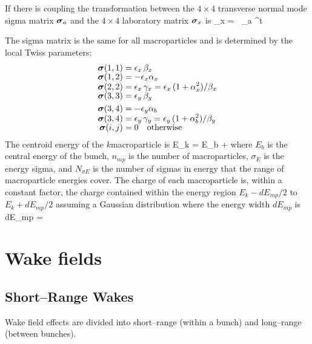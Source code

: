 If there is coupling the transformation between the $4\times 4$
transverse normal mode sigma matrix $\boldsymbol{\sigma}_a$ and the $4\times 4$
laboratory matrix $\boldsymbol{\sigma}_x$ is
\Begineq
  \bfsig_x = \bfV \, \bfsig_a \bfV^t
\Endeq

The sigma matrix is the same for all macroparticles and is
determined by the local Twiss parameters:
\begin{align}
  \bfsig(1,1) &= \epsilon_x \, \beta_x \CRNEG
  \bfsig(1,2) &= -\epsilon_x \alpha_x  \CRNEG
  \bfsig(2,2) &= \epsilon_x \, \gamma_x = 
      \epsilon_x \, (1 + \alpha_x^2) / \beta_x \CRNEG
  \bfsig(3,3) &= \epsilon_y \, \beta_y \\
  \bfsig(3,4) &= -\epsilon_y \alpha_b \CRNEG
  \bfsig(3,4) &= \epsilon_y \, \gamma_y = 
      \epsilon_y \, (1 + \alpha_b^2) / \beta_y \CRNEG
  \bfsig(i,j) &= 0 \quad \mbox{otherwise} \nonumber
\end{align}
The centroid energy of the $k$\Th macroparticle is
\Begineq
  E_k = E_b + 
\Endeq
where $E_b$ is the central energy of the bunch, $n_{mp}$ is the number
of macroparticles, $\sigma_E$ is the energy sigma, and
$N_{\sigma E}$ is the number of sigmas in energy that the range of
macroparticle energies cover. The charge of each macroparticle is,
within a constant factor, the charge contained within the energy
region $E_k - dE_{mp}/2$ to $E_k + dE_{mp}/2$ assuming a Gaussian
distribution where the energy width $dE_{mp}$ is
\Begineq
  dE_{mp} = 
\Endeq

\section{Wake fields}
\label{s:wake fields}

\subsection{Short--Range Wakes}

Wake field effects are divided into short--range (within a bunch) and
long--range (between bunches).

